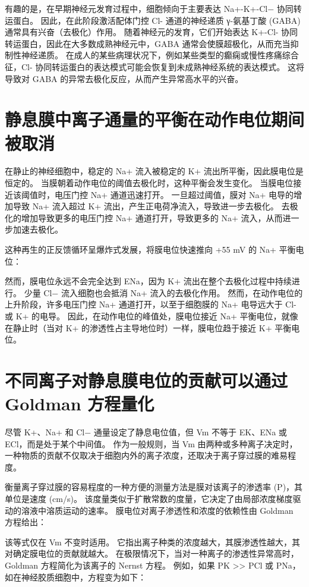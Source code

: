有趣的是，在早期神经元发育过程中，细胞倾向于主要表达 Na+-K+-Cl− 协同转运蛋白。 
因此，在此阶段激活配体门控 Cl- 通道的神经递质 γ-氨基丁酸 (GABA) 通常具有兴奋（去极化）作用。 
随着神经元的发育，它们开始表达 K+-Cl- 协同转运蛋白，因此在大多数成熟神经元中，GABA 通常会使膜超极化，从而充当抑制性神经递质。 
在成人的某些病理状况下，例如某些类型的癫痫或慢性疼痛综合征，Cl- 协同转运蛋白的表达模式可能会恢复到未成熟神经系统的表达模式。 
这将导致对 GABA 的异常去极化反应，从而产生异常高水平的兴奋。



\section{静息膜中离子通量的平衡在动作电位期间被取消}

在静止的神经细胞中，稳定的 Na+ 流入被稳定的 K+ 流出所平衡，因此膜电位是恒定的。 
当膜朝着动作电位的阈值去极化时，这种平衡会发生变化。 
当膜电位接近该阈值时，电压门控 Na+ 通道迅速打开。 
一旦超过阈值，膜对 Na+ 电导的增加导致 Na+ 流入超过 K+ 流出，产生正电荷净流入，导致进一步去极化。 
去极化的增加导致更多的电压门控 Na+ 通道打开，导致更多的 Na+ 流入，从而进一步加速去极化。


这种再生的正反馈循环呈爆炸式发展，将膜电位快速推向 +55 mV 的 Na+ 平衡电位：

然而，膜电位永远不会完全达到 ENa，因为 K+ 流出在整个去极化过程中持续进行。 
少量 Cl− 流入细胞也会抵消 Na+ 流入的去极化作用。 
然而，在动作电位的上升阶段，许多电压门控 Na+ 通道打开，以至于细胞膜的 Na+ 电导远大于 Cl- 或 K+ 的电导。 
因此，在动作电位的峰值处，膜电位接近 Na+ 平衡电位，就像在静止时（当对 K+ 的渗透性占主导地位时）一样，膜电位趋于接近 K+ 平衡电位。


\section{不同离子对静息膜电位的贡献可以通过 Goldman 方程量化}
尽管 K+、Na+ 和 Cl− 通量设定了静息电位值，但 Vm 不等于 EK、ENa 或 ECl，而是处于某个中间值。 
作为一般规则，当 Vm 由两种或多种离子决定时，一种物质的贡献不仅取决于细胞内外的离子浓度，还取决于离子穿过膜的难易程度。


衡量离子穿过膜的容易程度的一种方便的测量方法是膜对该离子的渗透率 (P)，其单位是速度 (cm/s)。 
该度量类似于扩散常数的度量，它决定了由局部浓度梯度驱动的溶液中溶质运动的速率。 
膜电位对离子渗透性和浓度的依赖性由 Goldman 方程给出：


该等式仅在 Vm 不变时适用。 
它指出离子种类的浓度越大，其膜渗透性越大，其对确定膜电位的贡献就越大。 
在极限情况下，当对一种离子的渗透性异常高时，Goldman 方程简化为该离子的 Nernst 方程。 
例如，如果 PK >> PCl 或 PNa，如在神经胶质细胞中，方程变为如下：


